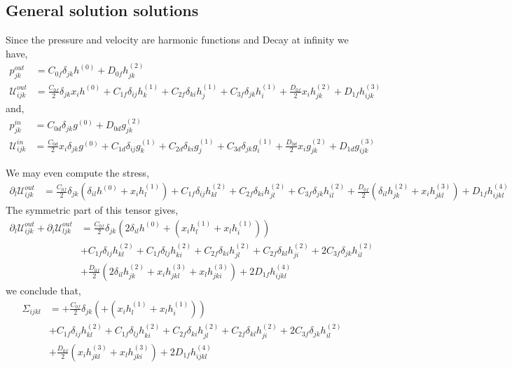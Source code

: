 \documentclass[12pt]{My_preprint}
\newcommand{\ii}{\delta}
\begin{document}
\subsection{General solution solutions}
Since the pressure and velocity are harmonic functions and Decay at infinity we have, 
\begin{align}
    p^{out}_{jk}
    &=
    C_{0f} \delta_{jk} h^{(0)} 
    + D_{0f} h^{(2)}_{jk}\\
    \mathcal{U}_{ijk}^{out}
    &=
    \frac{C_{0f}}{2} \delta_{jk} x_i   h^{(0)} 
    + 
    C_{1f} \delta_{ij} h^{(1)}_k
    + C_{2f} \delta_{ki} h^{(1)}_j
    + C_{3f} \delta_{jk} h^{(1)}_i
    + \frac{D_{0f}}{2}  x_i h^{(2)}_{jk}
    + D_{1f} h^{(3)}_{ijk}
\end{align}
and, 
\begin{align}
    p^{in}_{jk}
    &=
    C_{0d} \delta_{jk} g^{(0)} 
    + D_{0d} g^{(2)}_{jk}\\
    \mathcal{U}_{ijk}^{in}
    &=
    \frac{C_{0d}}{2} x_i  \delta_{jk} g^{(0)} 
    + 
    C_{1d} \delta_{ij} g^{(1)}_k
    + C_{2d} \delta_{ki} g^{(1)}_j
    + C_{3d} \delta_{jk} g^{(1)}_i
    + \frac{D_{0d}}{2}  x_i g^{(2)}_{jk}
    + D_{1d} g^{(3)}_{ijk}
\end{align}

We may even compute the stress, 
\begin{align}
    \partial_l \mathcal{U}_{ijk}^{out}
    &=
    \frac{C_{0f}}{2} \delta_{jk} (
        \ii_{il}  h^{(0)} 
        + x_i  h^{(1)}_l 
    )
    + 
    C_{1f} \delta_{ij} h^{(2)}_{kl}
    + C_{2f} \delta_{ki} h^{(2)}_{jl}
    + C_{3f} \delta_{jk} h^{(2)}_{il}
    + \frac{D_{0f}}{2}  (\ii_{il} h^{(2)}_{jk} + x_i h^{(3)}_{jkl})
    + D_{1f} h^{(4)}_{ijkl}
\end{align}
The symmetric part of this tensor gives, 
\begin{align}
    \partial_l \mathcal{U}_{ijk}^{out}
    + \partial_i \mathcal{U}_{ljk}^{out}
    &=
    \frac{C_{0f}}{2} \delta_{jk} (
        2\ii_{il}  h^{(0)} 
        + (x_i  h^{(1)}_l +x_l  h^{(1)}_i )
    )\\
    &+ 
    C_{1f} \delta_{ij} h^{(2)}_{kl}
    + C_{1f} \delta_{lj} h^{(2)}_{ki}
    + C_{2f} \delta_{ki} h^{(2)}_{jl}
    + C_{2f} \delta_{kl} h^{(2)}_{ji}
    + 2C_{3f} \delta_{jk} h^{(2)}_{il} \\
    &+ \frac{D_{0f}}{2}  (2\ii_{il} h^{(2)}_{jk} + x_i h^{(3)}_{jkl}+x_l h^{(3)}_{jki})
    +2 D_{1f} h^{(4)}_{ijkl}
\end{align}
we conclude that, 
\begin{align}
    \Sigma_{ijkl}
    &=
    + \frac{C_{0f}}{2} \delta_{jk} (
        + (x_i  h^{(1)}_l +x_l  h^{(1)}_i )
    )\\
    &+ 
    C_{1f} \delta_{ij} h^{(2)}_{kl}
    + C_{1f} \delta_{lj} h^{(2)}_{ki}
    + C_{2f} \delta_{ki} h^{(2)}_{jl}
    + C_{2f} \delta_{kl} h^{(2)}_{ji}
    + 2C_{3f} \delta_{jk} h^{(2)}_{il} \\
    &+ \frac{D_{0f}}{2}  (x_i h^{(3)}_{jkl}+x_l h^{(3)}_{jki})
    +2 D_{1f} h^{(4)}_{ijkl}
\end{align}
\end{document}
